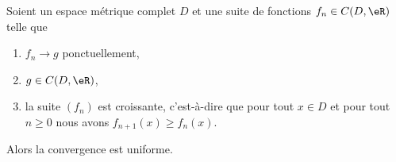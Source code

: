 \begin{theorem} \label{ThoUFPLEZh}
	Soient un espace métrique complet \( D\) et une suite de fonctions \( f_n\in C(D,\eR)\) telle que
	\begin{enumerate}
		\item
		      \( f_n\to g\) ponctuellement,
		\item
		      \( g\in C(D,\eR)\),
		\item
		      la suite \( (f_n)\) est croissante, c'est-à-dire que pour tout \( x\in D\) et pour tout \( n\geq 0\) nous avons \( f_{n+1}(x)\geq f_n(x)\).
	\end{enumerate}
	Alors la convergence est uniforme.
\end{theorem}

